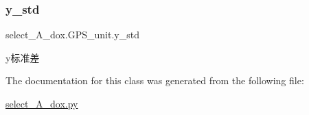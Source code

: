\subsubsection{\texorpdfstring{y\+\_\+std}{y\_std}}
{\footnotesize\ttfamily select\+\_\+\+A\+\_\+dox.\+G\+P\+S\+\_\+unit.\+y\+\_\+std}



y标准差 



The documentation for this class was generated from the following file\+:\begin{DoxyCompactItemize}
\item 
\hyperlink{select___a__dox_8py}{select\+\_\+\+A\+\_\+dox.\+py}\end{DoxyCompactItemize}
